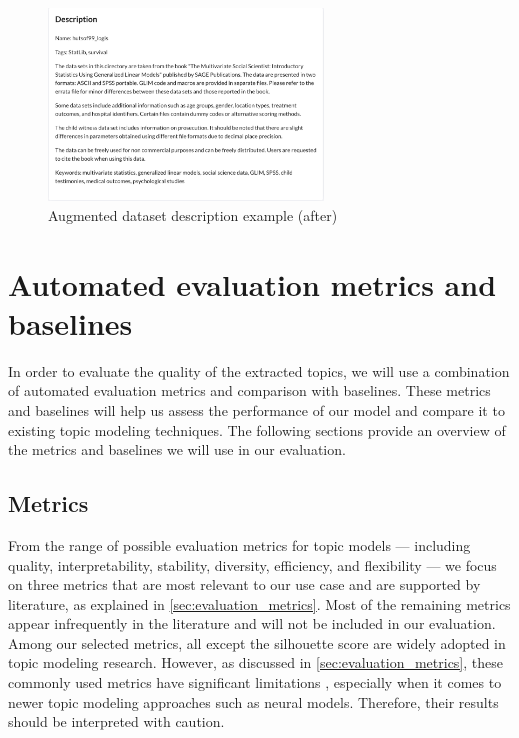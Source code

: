 \begin{figure}[h]
    \centering
    \includegraphics[width=0.65\textwidth]{figures/augmented_description_after.png}
    \caption{Augmented dataset description example (after)}
    \label{fig:augmented_description_after}
\end{figure}


\section{Automated evaluation metrics and baselines}
\label{sec:automated_evaluation}
In order to evaluate the quality of the extracted topics, we will use a combination of automated evaluation metrics and comparison with baselines. These metrics and baselines will help us assess the performance of our model and compare it to existing topic modeling techniques. The following sections provide an overview of the metrics and baselines we will use in our evaluation.

\subsection{Metrics}
From the range of possible evaluation metrics for topic models — including quality, interpretability, stability, diversity, efficiency, and flexibility — we focus on three metrics that are most relevant to our use case and are supported by literature, as explained in \cref{sec:evaluation_metrics}. Most of the remaining metrics appear infrequently in the literature and will not be included in our evaluation. Among our selected metrics, all except the silhouette score are widely adopted in topic modeling research. However, as discussed in \cref{sec:evaluation_metrics}, these commonly used metrics have significant limitations \cite{doogan_topic_2021, hoyle_is_2021}, especially when it comes to newer topic modeling approaches such as neural models. Therefore, their results should be interpreted with caution.

